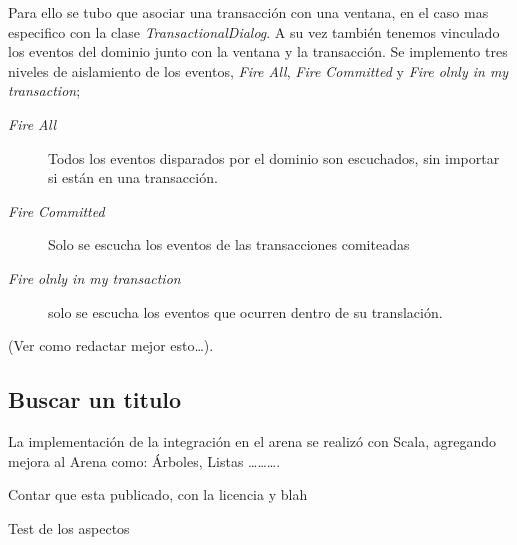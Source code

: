 Para ello se tubo que asociar una transacción con una ventana, en el caso mas
especifico con la clase \emph{TransactionalDialog}. A su vez también tenemos
vinculado los eventos del dominio junto con la ventana y la transacción.
Se implemento tres niveles de aislamiento de los eventos,  \emph{Fire All},
\emph{Fire Committed} y \emph{Fire olnly in my transaction};

\begin{description}
	\item[\emph{Fire All}] Todos los eventos disparados por el dominio son
	escuchados, sin importar si están en una transacción.

	\item[\emph{Fire Committed}] Solo se escucha los eventos de las transacciones
		comiteadas
	
	\item[\emph{Fire olnly in my transaction}] solo se escucha los eventos que
		ocurren dentro de su translación.

 \end{description}
(Ver como redactar mejor esto\ldots ).

	
\subsection{Buscar un  titulo}
La implementación de la integración en el arena se realizó con Scala, agregando
mejora al Arena como: Árboles, Listas \ldots \ldots \ldots. 
	
	
Contar que esta publicado, con la licencia y blah

Test de los aspectos


